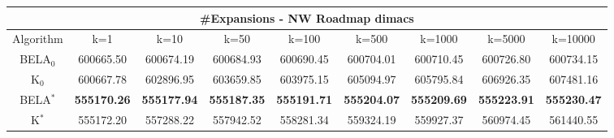 \begin{tabular}{c|cccccccc}\toprule
\multicolumn{9}{c}{#Expansions - NW Roadmap dimacs}\\ \midrule
Algorithm & k=1 & k=10 & k=50 & k=100 & k=500 & k=1000 & k=5000 & k=10000 \\ \midrule
BELA$_0$ & 600665.50 & 600674.19 & 600684.93 & 600690.45 & 600704.01 & 600710.45 & 600726.80 & 600734.15 \\
K$_0$ & 600667.78 & 602896.95 & 603659.85 & 603975.15 & 605094.97 & 605795.84 & 606926.35 & 607481.16 \\
BELA$^*$ & \textbf{555170.26} & \textbf{555177.94} & \textbf{555187.35} & \textbf{555191.71} & \textbf{555204.07} & \textbf{555209.69} & \textbf{555223.91} & \textbf{555230.47} \\
K$^*$ & 555172.20 & 557288.22 & 557942.52 & 558281.34 & 559324.19 & 559927.37 & 560974.45 & 561440.55 \\ \bottomrule 
\end{tabular}
